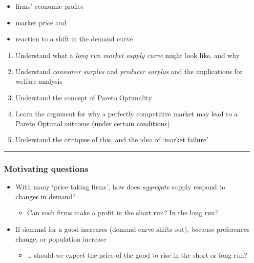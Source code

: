 \documentclass[]{article}
\providecommand{\tightlist}{%
  \setlength{\itemsep}{0pt}\setlength{\parskip}{0pt}}
\begin{document}
\begin{itemize}
\tightlist
\item
  firms' economic profits
\item
  market price and
\item
  reaction to a shift in the demand curve
\end{itemize}

\begin{enumerate}
\def\labelenumi{\arabic{enumi}.}
\tightlist
\item
  Understand what a \emph{long run market supply curve} might look like, and why
\item
  Understand \emph{consumer surplus} and \emph{producer surplus} and the implications for welfare analysis
\item
  Understand the concept of Pareto Optimality
\item
  Learn the argument for why a perfectly competitive market may lead to a Pareto Optimal outcome (under certain conditions)
\item
  Understand the critiques of this, and the idea of `market failure'
\end{enumerate}

\begin{center}\rule{0.5\linewidth}{\linethickness}\end{center}

\hypertarget{motivating-questions}{%
\subsubsection{Motivating questions}\label{motivating-questions}}

\begin{itemize}
\tightlist
\item
  With many `price taking firms', how does \emph{aggregate} supply respond to changes in demand?

  \begin{itemize}
  \tightlist
  \item
    Can such firms make a profit in the short run? In the long run?
  \end{itemize}
\item
  If demand for a good increases (demand curve shifts out), because preferences change, or population increase

  \begin{itemize}
  \tightlist
  \item
    \ldots{} should we expect the price of the good to rise in the short or long run?
  \end{itemize}
\end{itemize}
\end{document}
